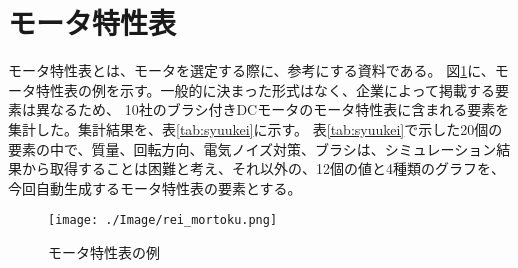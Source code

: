 
\section{モータ特性表}\label{mortoku}
モータ特性表とは、モータを選定する際に、参考にする資料である\cite{仕様の見方}。
図\ref{fig:rei_mortoku}に、モータ特性表の例を示す\cite{特性表2}。一般的に決まった形式はなく、企業によって掲載する要素は異なるため、
10社のブラシ付きDCモータのモータ特性表\cite{特性表1,特性表2,特性表3,特性表4,特性表5,特性表6,特性表7,特性表8,特性表9,特性表10}に含まれる要素を集計した。集計結果を、表\ref{tab:syuukei}に示す。
表\ref{tab:syuukei}で示した20個の要素の中で、質量、回転方向、電気ノイズ対策、ブラシは、シミュレーション結果から取得することは困難と考え、それ以外の、12個の値と4種類のグラフを、今回自動生成するモータ特性表の要素とする。
	\begin{figure}[t]
		\centering
		\texttt{[image: ./Image/rei\_mortoku.png]}
		\caption{モータ特性表の例}
		\label{fig:rei_mortoku}
	  \end{figure} 

